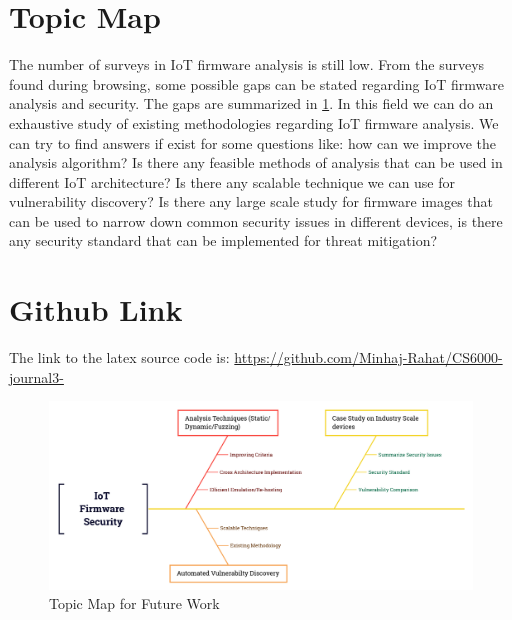 \documentclass[fleqn,10pt]{olplainarticle}
\begin{document}
\section{Topic Map}

The number of surveys in IoT firmware analysis is still low. From the surveys found during browsing, some possible gaps can be stated regarding IoT firmware analysis and security. The gaps are summarized in \ref{fig:my_label}. In this field we can do an exhaustive study of existing methodologies regarding IoT firmware analysis. We can try to find answers if exist for some questions like: how can we improve the analysis algorithm? Is there any feasible methods of analysis that can be used in different IoT architecture? Is there any scalable technique we can use for vulnerability discovery? Is there any large scale study for firmware images that can be used to narrow down common security issues in different devices, is there any security standard that can be implemented for threat mitigation?

\section{Github Link}
\appendix

The link to the latex source code is: \url{https://github.com/Minhaj-Rahat/CS6000-journal3-}

\begin{figure}[h]
    \centering
    \includegraphics[width=1\linewidth]{IoT Firmware Security.png}
    \caption{Topic Map for Future Work}
    \label{fig:my_label}
\end{figure}

\clearpage



\end{document}
